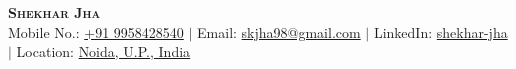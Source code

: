 \documentclass[letterpaper,8pt]{article}
\makeatletter
\newcommand{\resumeItem}[1]{
  \item\small{
    {#1 \vspace{-2pt}}
  }
}
\newcommand{\resumeSubheading}[4]{
  \vspace{-2pt}\item
    \begin{tabular*}{0.97\textwidth}[t]{l@{\extracolsep{\fill}}r}
      \textbf{#1} & #2 \\
      \textit{\small#3} & \textit{\small #4} \\
    \end{tabular*}\vspace{-7pt}
}
\newcommand{\resumeSubHeadingListStart}{\begin{itemize}[leftmargin=0.15in, label={}]}
\newcommand{\resumeItemListStart}{\begin{itemize}}
\newcommand{\resumeItemListEnd}{\end{itemize}\vspace{-5pt}}
\makeatother
\begin{document}

\begin{center}
    \textbf{\Huge \scshape Shekhar Jha} \\ \vspace{3pt}
    \small
    {Mobile No.: }\href{tel:919958428540}{+91 9958428540}
    $|$
    {Email: }\href{mailto:skjha98@gmail.com}{skjha98@gmail.com}
    $|$
    {LinkedIn: }\href{https://www.linkedin.com/in/shekhar-jha/}{shekhar-jha}
    $|$
    {Location: }\href{https://www.google.com/maps/place/Noida,+Uttar+Pradesh/@28.5222018,77.4018255,12z/data=!3m1!4b1!4m6!3m5!1s0x390ce5a43173357b:0x37ffce30c87cc03f!8m2!3d28.5355161!4d77.3910265!16zL20vMDN3dHow?entry=ttu}{Noida, U.P., India}
\end{center}








  
    
\end{document}
